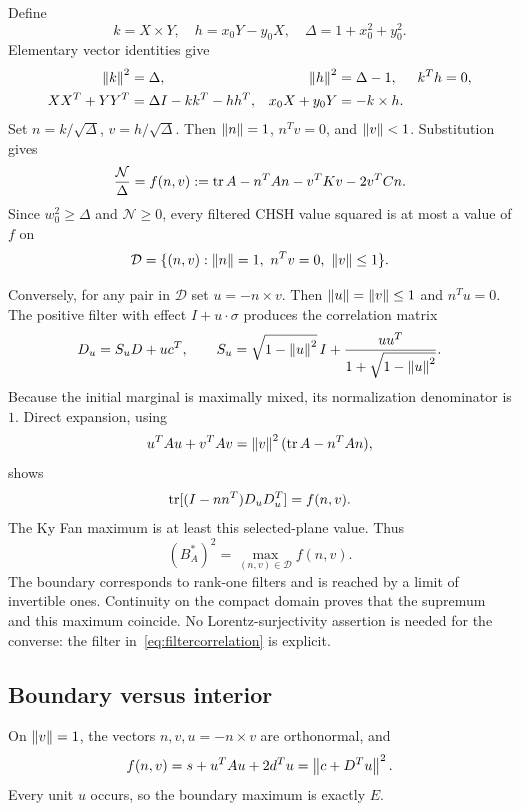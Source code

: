 Define
\begin{equation}
 k=X\times Y,\quad h=x_0Y-y_0X,\quad
 \Delta=1+x_0^2+y_0^2.
\end{equation}
Elementary vector identities give
\begin{align}
 \left\lVert k\right\rVert^2&=\Delta,& \left\lVert h\right\rVert^2&=\Delta-1,& k^Th&=0,\\
 XX^T+YY^T&=\Delta I-kk^T-hh^T,&
 x_0X+y_0Y&=-k\times h.
 \label{eq:bivectoridentities}
\end{align}
Set $n=k/\sqrt\Delta$, $v=h/\sqrt\Delta$. Then $\left\lVert n\right\rVert=1$, $n^Tv=0$, and $\left\lVert v\right\rVert<1$. Substitution gives
\begin{equation}
 \frac{\mathcal N}{\Delta}
 =f(n,v):=\operatorname{tr} A-n^TAn-v^TKv-2v^TCn.
 \label{eq:f}
\end{equation}
Since $w_0^2\ge\Delta$ and $\mathcal N\ge0$, every filtered CHSH value squared is at most a value of $f$ on
\begin{equation}
 \mathcal D=\{(n,v):\norm n=1,\ n^Tv=0,\ \norm v\le1\}.
 \label{eq:domain}
\end{equation}

Conversely, for any pair in $\mathcal D$ set $u=-n\times v$. Then $\left\lVert u\right\rVert=\left\lVert v\right\rVert\le1$ and $n^Tu=0$. The positive filter with effect $I+u\cdot\sigma$ produces the correlation matrix
\begin{equation}
 D_u=S_uD+uc^T,\qquad
 S_u=\sqrt{1-\left\lVert u\right\rVert^2}\,I+
 \frac{uu^T}{1+\sqrt{1-\left\lVert u\right\rVert^2}}.
 \label{eq:filtercorrelation}
\end{equation}
Because the initial marginal is maximally mixed, its normalization denominator is $1$. Direct expansion, using
\begin{equation}
 u^TAu+v^TAv=\left\lVert v\right\rVert^2(\operatorname{tr} A-n^TAn),
\end{equation}
shows
\begin{equation}
 \operatorname{tr}[(I-nn^T)D_uD_u^T]=f(n,v).
 \label{eq:converse}
\end{equation}
The Ky Fan maximum is at least this selected-plane value. Thus
\begin{equation}
 \boxed{(B_A^*)^2=\max_{(n,v)\in\mathcal D}f(n,v).}
 \label{eq:compactreduction}
\end{equation}
The boundary corresponds to rank-one filters and is reached by a limit of invertible ones. Continuity on the compact domain proves that the supremum and this maximum coincide. No Lorentz-surjectivity assertion is needed for the converse: the filter in~\eqref{eq:filtercorrelation} is explicit.

\subsection{Boundary versus interior}
On $\left\lVert v\right\rVert=1$, the vectors $n,v,u=-n\times v$ are orthonormal, and
\begin{equation}
 f(n,v)=s+u^TAu+2d^Tu=\left\lVert c+D^Tu\right\rVert^2.
\end{equation}
Every unit $u$ occurs, so the boundary maximum is exactly $E$.

